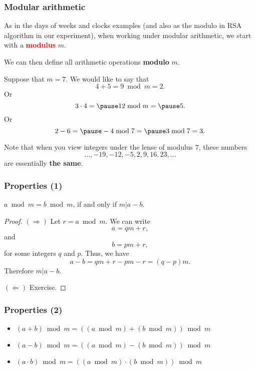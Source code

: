 \begin{frame}
  \frametitle{Modular arithmetic}

  As in the days of weeks and clocks examples (and also as the modulo
  in RSA algorithm in our experiment), when working under modular
  arithmetic, we start with a \textcolor{red}{\bf modulus} $m$.

  \vspace{0.1in}
  \pause
  We can then define all arithmetic operations {\bf modulo} $m$.

  \vspace{0.1in}
  \pause
  Suppose that $m=7$.  We would like to say that
  {\small
  \[
  4 + 5 = 9 \bmod m= 2.
  \]
  Or
  \[
  3\cdot 4 = \pause 12 \bmod m = \pause 5.
  \]
  Or
  \[
  2 - 6 = \pause -4 \bmod 7 = \pause 3 \bmod 7 = 3.
  \]
  }

  \pause
  Note that when you view integers under the lense of modulus $7$,
  these numbers
  \[
  \ldots,-19,-12,-5,2,9,16,23,\ldots
  \]
  are essentially {\bf the same}.
\end{frame}

\begin{frame}
  \frametitle{Properties (1)}

  $a \bmod m = b \bmod m$, if and only if $m|a - b$.

  \pause

  \begin{proof}
    {\small
      $(\Rightarrow)$
      Let $r=a \bmod m$.  We can write
      \[
      a = qm + r,
      \]
      and
      \[
      b = pm + r,
      \]
      for some integers $q$ and $p$.  Thus, we have
      \[
      a - b = qm + r - pm - r = (q-p)m.
      \]
      Therefore $m|a-b$.

      $(\Leftarrow)$ Exercise.
    }
  \end{proof}
  
\end{frame}

\begin{frame}
  \frametitle{Properties (2)}

  \begin{itemize}
  \item $(a + b) \bmod m = ((a \bmod m) + (b \bmod m)) \bmod m$
  \item $(a - b) \bmod m = ((a \bmod m) - (b \bmod m)) \bmod m$
  \item $(a \cdot b) \bmod m = ((a \bmod m) \cdot (b \bmod m)) \bmod m$
  \end{itemize}
  
\end{frame}

